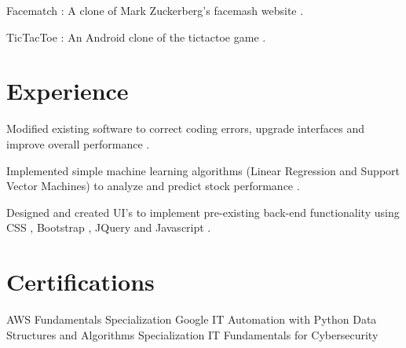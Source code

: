 \documentclass[]{deedy-resume-openfont}
\begin{document}
\begin{minipage}[t]{0.66\textwidth}
\begin{tightemize}
\item Facematch : A clone of Mark Zuckerberg's facemash website .
\item TicTacToe : An Android clone of the tictactoe game .
\end{tightemize}
\sectionsep


\section{Experience}
\vspace{\topsep}
\begin{tightemize}
\item Modified existing software to correct coding errors, upgrade interfaces and improve overall performance .
\item Implemented simple machine learning algorithms (Linear Regression and Support Vector Machines) to analyze and predict stock performance .
\end{tightemize}
\sectionsep

\vspace{\topsep}
\begin{tightemize}
\item Designed and created UI's to implement pre-existing back-end functionality using CSS , Bootstrap , JQuery and Javascript .
\end{tightemize}
\sectionsep


\section{Certifications} 
AWS Fundamentals Specialization
\textbullet{} Google IT Automation with Python
\textbullet{} Data Structures and Algorithms Specialization
\textbullet{} IT Fundamentals for Cybersecurity
\sectionsep

\end{minipage} 
\end{document}
